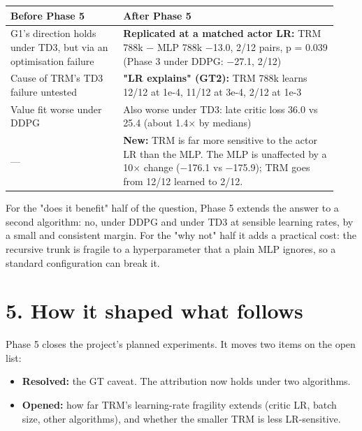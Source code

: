 \documentclass[11pt]{article}
\begin{document}
\begin{center}\small\begin{tabular}{>{\raggedright\arraybackslash}p{0.322\linewidth}>{\raggedright\arraybackslash}p{0.612\linewidth}}
\toprule
Before Phase 5 & After Phase 5 \\
\midrule
G1's direction holds under TD3, but via an optimisation failure & \textbf{Replicated at a matched actor LR:} TRM 788k $-$ MLP 788k $-$13.0, 2/12 pairs, p = 0.039 (Phase 3 under DDPG: $-$27.1, 2/12) \\
Cause of TRM's TD3 failure untested & \textbf{"LR explains" (GT2):} TRM 788k learns 12/12 at 1e-4, 11/12 at 3e-4, 2/12 at 1e-3 \\
Value fit worse under DDPG & Also worse under TD3: late critic loss 36.0 vs 25.4 (about 1.4$\times$ by medians) \\
--- & \textbf{New:} TRM is far more sensitive to the actor LR than the MLP. The MLP is unaffected by a 10$\times$ change ($-$176.1 vs $-$175.9); TRM goes from 12/12 learned to 2/12. \\
\bottomrule
\end{tabular}\end{center}



For the "does it benefit" half of the question, Phase 5 extends the answer to a second algorithm: no, under DDPG and under TD3 at sensible learning rates, by a small and consistent margin. For the "why not" half it adds a practical cost: the recursive trunk is fragile to a hyperparameter that a plain MLP ignores, so a standard configuration can break it.



\section*{5. How it shaped what follows}



Phase 5 closes the project's planned experiments. It moves two items on the open list:



\begin{itemize}
\item \textbf{Resolved:} the GT caveat. The attribution now holds under two algorithms.
\item \textbf{Opened:} how far TRM's learning-rate fragility extends (critic LR, batch size, other algorithms), and whether the smaller TRM is less LR-sensitive.
\end{itemize}
\end{document}
